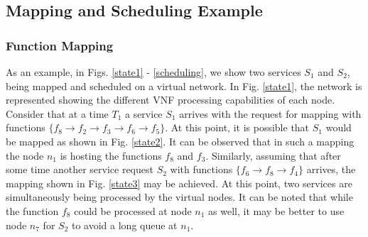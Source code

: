 \documentclass[conference]{IEEEtran}
\begin{document}
\subsection{Mapping and Scheduling Example}
\subsubsection{Function Mapping}
As an example, in Figs. \ref{state1} - \ref{scheduling}, we show two services $S_1$ and $S_2$, being mapped and scheduled on a virtual network. In Fig. \ref{state1}, the network is represented showing the different VNF processing capabilities of each node. Consider that at a time $T_1$ a service $S_1$ arrives with the request for mapping with functions $\{f_8\rightarrow f_2\rightarrow f_3\rightarrow f_6\rightarrow f_5\}$. At this point, it is possible that $S_1$ would be mapped as shown in Fig. \ref{state2}. It can be observed that in such a mapping the node $n_1$ is hosting the functions $f_8$ and $f_3$. Similarly, assuming that after some time another service request $S_2$ with functions $\{f_6\rightarrow f_8\rightarrow f_4\}$ arrives, the mapping shown in Fig. \ref{state3} may be achieved. At this point, two services are simultaneously being processed by the virtual nodes. It can be noted that while the function $f_8$ could be processed at node $n_1$ as well, it may be better to use node $n_7$ for $S_2$ to avoid a long queue at $n_1$.
\end{document}
